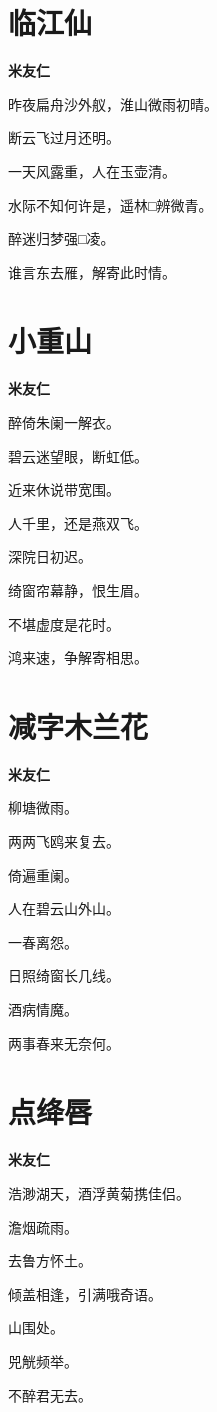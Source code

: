 \documentclass[12pt,a4paper]{ctexbook}
\begin{document}
\section{临江仙}
\textbf{米友仁}\par\vspace{0.5em}
昨夜扁舟沙外舣，淮山微雨初晴。\par
断云飞过月还明。\par
一天风露重，人在玉壶清。\par
水际不知何许是，遥林□辨微青。\par
醉迷归梦强□凌。\par
谁言东去雁，解寄此时情。\par

\section{小重山}
\textbf{米友仁}\par\vspace{0.5em}
醉倚朱阑一解衣。\par
碧云迷望眼，断虹低。\par
近来休说带宽围。\par
人千里，还是燕双飞。\par
深院日初迟。\par
绮窗帘幕静，恨生眉。\par
不堪虚度是花时。\par
鸿来速，争解寄相思。\par

\section{减字木兰花}
\textbf{米友仁}\par\vspace{0.5em}
柳塘微雨。\par
两两飞鸥来复去。\par
倚遍重阑。\par
人在碧云山外山。\par
一春离怨。\par
日照绮窗长几线。\par
酒病情魔。\par
两事春来无奈何。\par

\section{点绛唇}
\textbf{米友仁}\par\vspace{0.5em}
浩渺湖天，酒浮黄菊携佳侣。\par
澹烟疏雨。\par
去鲁方怀土。\par
倾盖相逢，引满哦奇语。\par
山围处。\par
兕觥频举。\par
不醉君无去。\par
\end{document}
